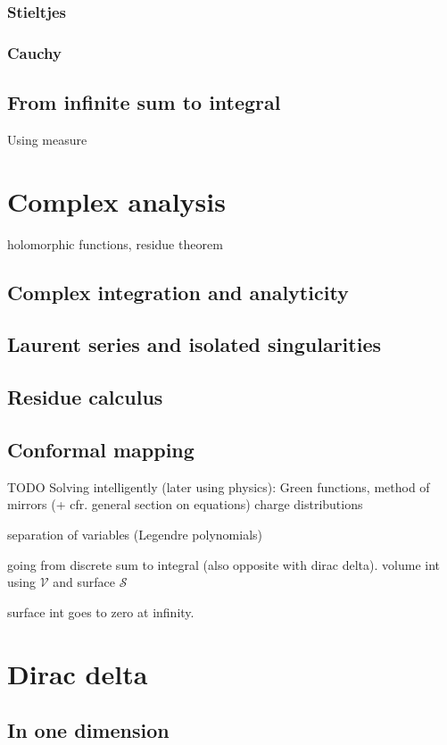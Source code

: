 \subsubsection{Stieltjes}
\subsubsection{Cauchy}

\subsection{From infinite sum to integral}
Using measure

\section{Complex analysis}
holomorphic functions, residue theorem

\subsection{Complex integration and analyticity}
\subsection{Laurent series and isolated singularities}
\subsection{Residue calculus}
\subsection{Conformal mapping}


TODO
Solving intelligently (later using physics): Green functions, method of mirrors (+ cfr. general section on equations)
charge distributions

separation of variables (Legendre polynomials)

going from discrete sum to integral (also opposite with dirac delta). volume int using $\mathcal{V}$ and surface $\mathcal{S}$

surface int goes to zero at infinity.

\section{Dirac delta}
\subsection{In one dimension}
